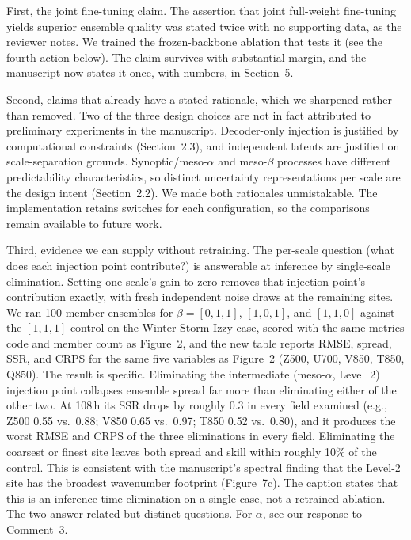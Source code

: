 \documentclass[12pt]{article}
\begin{document}
First, the joint fine-tuning claim. The assertion that joint full-weight fine-tuning
yields superior ensemble quality was stated twice with no supporting data, as the
reviewer notes. We trained the frozen-backbone ablation that tests it (see
the fourth action below). The claim survives with substantial margin, and the
manuscript now states it once, with numbers, in Section~5.

Second, claims that already have a stated rationale, which we sharpened rather
than removed. Two of the three design choices are not in fact attributed to
preliminary experiments in the manuscript. Decoder-only injection
is justified by computational constraints (Section~2.3), and independent latents are
justified on scale-separation grounds. Synoptic/meso-$\alpha$ and meso-$\beta$
processes have different predictability characteristics, so distinct uncertainty
representations per scale are the design intent (Section~2.2). We made both
rationales unmistakable. The implementation retains switches for each
configuration, so the comparisons remain available to future work.

Third, evidence we can supply without retraining. The per-scale question (what does each injection point contribute?) is answerable
at inference by single-scale elimination. Setting one scale's gain to zero removes that injection point's
contribution exactly, with fresh independent noise draws at the remaining sites. We
ran 100-member ensembles for $\beta=[0,1,1]$, $[1,0,1]$, and $[1,1,0]$ against the
$[1,1,1]$ control on the Winter Storm Izzy case, scored with the same metrics code
and member count as Figure~2, and the new table reports RMSE, spread, SSR, and CRPS
for the same five variables as Figure~2 (Z500, U700, V850, T850, Q850). The result
is specific. Eliminating the intermediate (meso-$\alpha$, Level~2) injection point
collapses ensemble spread far more than eliminating either of the other two. At
108\,h its SSR drops by roughly 0.3 in every field examined (e.g., Z500 0.55 vs.\
0.88; V850 0.65 vs.\ 0.97; T850 0.52 vs.\ 0.80), and it produces the worst RMSE and
CRPS of the three eliminations in every field. Eliminating the coarsest
or finest site leaves both spread and skill within roughly 10\% of the control. This is consistent with the manuscript's spectral finding that the Level-2
site has the broadest wavenumber footprint (Figure~7c). The caption states
that this is an inference-time elimination on a single case, not a retrained
ablation. The two answer related but distinct questions. For $\alpha$, see our
response to Comment~3.
\end{document}
